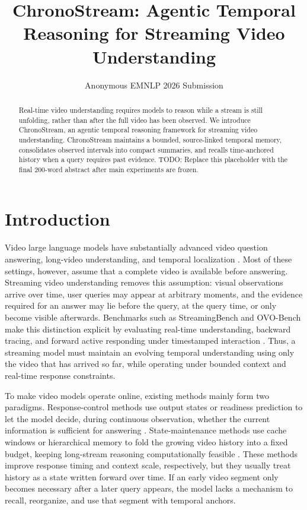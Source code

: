 \documentclass[11pt]{article}
\title{ChronoStream: Agentic Temporal Reasoning for Streaming Video Understanding}
\author{Anonymous EMNLP 2026 Submission}
\begin{document}
\maketitle

\begin{abstract}
Real-time video understanding requires models to reason while a stream is still unfolding, rather than after the full video has been observed.
We introduce ChronoStream, an agentic temporal reasoning framework for streaming video understanding.
ChronoStream maintains a bounded, source-linked temporal memory, consolidates observed intervals into compact summaries, and recalls time-anchored history when a query requires past evidence.
TODO: Replace this placeholder with the final 200-word abstract after main experiments are frozen.
\end{abstract}

\section{Introduction}

Video large language models have substantially advanced video question answering, long-video understanding, and temporal localization \citep{mvbench2024,longvideobench2024,videomme2025}.
Most of these settings, however, assume that a complete video is available before answering.
Streaming video understanding removes this assumption: visual observations arrive over time, user queries may appear at arbitrary moments, and the evidence required for an answer may lie before the query, at the query time, or only become visible afterwards.
Benchmarks such as StreamingBench and OVO-Bench make this distinction explicit by evaluating real-time understanding, backward tracing, and forward active responding under timestamped interaction \citep{streamingbench2024,ovobench2025}.
Thus, a streaming model must maintain an evolving temporal understanding using only the video that has arrived so far, while operating under bounded context and real-time response constraints.

To make video models operate online, existing methods mainly form two paradigms.
Response-control methods use output states or readiness prediction to let the model decide, during continuous observation, whether the current information is sufficient for answering \citep{videollm_online2024,livecc2025,streamready2026,streamo2026,aura2026}.
State-maintenance methods use cache windows or hierarchical memory to fold the growing video history into a fixed budget, keeping long-stream reasoning computationally feasible \citep{streamingvlm2025,fluxmem2026,streamforest2025,thinkstream2026,vst2026}.
These methods improve response timing and context scale, respectively, but they usually treat history as a state written forward over time.
If an early video segment only becomes necessary after a later query appears, the model lacks a mechanism to recall, reorganize, and use that segment with temporal anchors.
\end{document}

